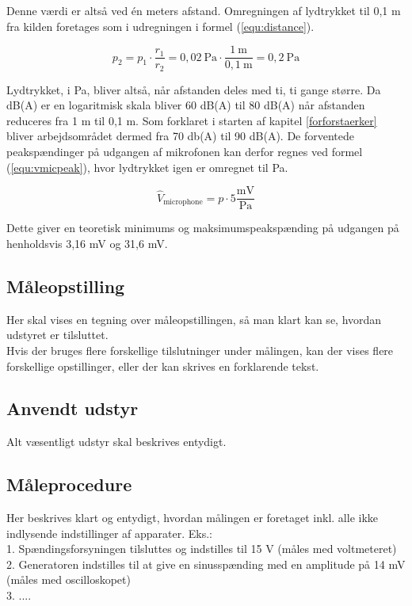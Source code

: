 Denne værdi er altså ved én meters afstand. Omregningen af lydtrykket til 0,1 m fra kilden foretages som i udregningen i formel (\ref{equ:distance}).

\begin{equation}
\label{equ:distance}
p_2 = p_1 \cdot \frac{r_1}{r_2} = 0,02~\mathrm{Pa} \cdot \frac{1~\mathrm{m}}{0,1~\mathrm{m}} = 0,2~\mathrm{Pa}
\end{equation}

Lydtrykket, i Pa, bliver altså, når afstanden deles med ti, ti gange større. Da dB(A) er en logaritmisk skala bliver 60 dB(A) til 80 dB(A) når afstanden reduceres fra 1 m til 0,1 m. Som forklaret i starten af kapitel \ref{forforstaerker} bliver arbejdsområdet dermed fra 70 db(A) til 90 dB(A). De forventede peakspændinger på udgangen af mikrofonen kan derfor regnes ved formel (\ref{equ:vmicpeak}), hvor lydtrykket igen er omregnet til Pa.

\begin{equation}
\label{equ:vmicpeak}
\hat{V}_{\mathrm{microphone}} = p \cdot 5\frac{\mathrm{mV}}{\mathrm{Pa}}
\end{equation}

Dette giver en teoretisk minimums og maksimumspeakspænding på udgangen på henholdsvis 3,16 mV og 31,6 mV.

\subsection*{Måleopstilling}
\label{mic_output_maaleopstilling}
Her skal vises en tegning over måleopstillingen, så man klart kan se, hvordan udstyret er tilsluttet.\\
Hvis der bruges flere forskellige tilslutninger under målingen, kan der vises flere forskellige opstillinger, eller der kan skrives en forklarende tekst.\\

\subsection*{Anvendt udstyr}
\label{mic_output_anvendtudstyr}
Alt væsentligt udstyr skal beskrives entydigt.\\

\subsection*{Måleprocedure}
\label{mic_output_maaleprocedure}
Her beskrives klart og entydigt, hvordan målingen er foretaget inkl. alle ikke indlysende indstillinger af apparater. Eks.: \\
1. Spændingsforsyningen tilsluttes og indstilles til 15 V (måles med voltmeteret) \\
2. Generatoren indstilles til at give en sinusspænding med en amplitude på 14 mV (måles med oscilloskopet) \\
3. ....\\

